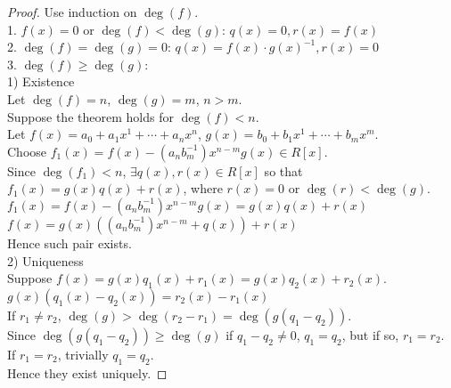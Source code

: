 \documentclass{report}
\begin{document}
		\begin{proof}
				Use induction on $\deg(f)$.\\
				1. $f(x)=0$ or $\deg(f)<\deg(g)$: $q(x)=0, r(x)=f(x)$\\
				2. $\deg(f)=\deg(g)=0$: $q(x)=f(x) \cdot g(x)^{-1}, r(x)=0$\\
				3. $\deg(f)\ge\deg(g)$:\\
				
				1) Existence\\
				Let $\deg(f)=n$, $\deg(g)=m$, $n>m$.\\
				Suppose the theorem holds for $\deg(f)<n$.\\
				Let $f(x)=a_0+a_1x^1+\cdots+a_nx^n$, $g(x)=b_0+b_1x^1+\cdots+b_mx^m$.\\
				Choose $f_1(x)=f(x)-(a_nb_m^{-1})x^{n-m}g(x)\in R[x]$.\\
				Since $\deg(f_1)<n$, $\exists q(x),r(x)\in R[x]$ so that $f_1(x)=g(x)q(x)+r(x)$, where $r(x)=0$ or $\deg(r)<\deg(g)$.\\
				$f_1(x)=f(x)-(a_nb_m^{-1})x^{n-m}g(x)=g(x)q(x)+r(x)$\\
				$f(x)=g(x)((a_nb_m^{-1})x^{n-m}+q(x))+r(x)$\\
				Hence such pair exists.\\
				
				2) Uniqueness\\
				Suppose $f(x)=g(x)q_1(x)+r_1(x)=g(x)q_2(x)+r_2(x)$.\\
				$g(x)(q_1(x)-q_2(x))=r_2(x)-r_1(x)$\\
				If $r_1 \ne r_2$, $\deg(g)>\deg(r_2-r_1)=\deg(g(q_1-q_2))$.\\
				Since $\deg(g(q_1-q_2))\ge\deg(g)$ if $q_1-q_2\ne0$, $q_1=q_2$, but if so, $r_1=r_2$.\\
				If $r_1=r_2$, trivially $q_1=q_2$.\\
				Hence they exist uniquely.
		\end{proof}
		
\end{document}
